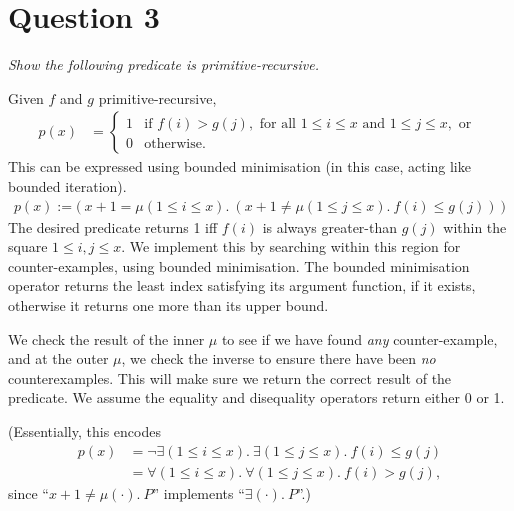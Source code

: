 \documentclass[a4paper]{article}
\begin{document}
\section*{Question 3}
\begin{center}
  \textit{Show the following predicate is primitive-recursive.}
\end{center}
Given $f$ and $g$ primitive-recursive,
\begin{align*}
  p(x) &= \begin{cases}
    1 & \text{if } f(i) > g(j),\text{ for all } 1 \le i \le x \text{ and } 1 \le j \le x,\text{ or } \\
    0 & \text{otherwise.}
  \end{cases}
\end{align*}
This can be expressed using bounded minimisation
(in this case, acting like bounded iteration).
\begin{align*}
  p(x) := \big(~x+1 = \mu(1\le i \le x).~(x+1 \ne \mu(1\le j \le x).~f(i) \le g(j))~\big)
\end{align*}
The desired predicate returns 1 iff $f(i)$ is always
greater-than $g(j)$ within
the square $1 \le i,j \le x$.
We implement this by searching within this region for counter-examples,
using bounded minimisation.
The bounded minimisation operator returns the least index satisfying its
argument function, if it exists, otherwise it returns one more than its upper bound.

We check the result of the inner $\mu$ to see if we have found \textit{any} counter-example,
and at the outer $\mu$, we check the inverse to ensure there have been \textit{no} counterexamples.
This will make sure we return the correct result of the predicate.
We assume the equality and disequality operators return either 0 or 1.

(Essentially, this encodes
\begin{align*}
  p(x) &= \neg \exists(1 \le i \le x).~\exists(1 \le j \le x).~f(i) \le g(j) \\
       &= \forall(1 \le i \le x).~\forall(1 \le j \le x).~f(i) > g(j),
\end{align*}
since ``$x + 1 \ne \mu(\cdot).~P$'' implements ``$\exists(\cdot).~P$''.)
\end{document}
